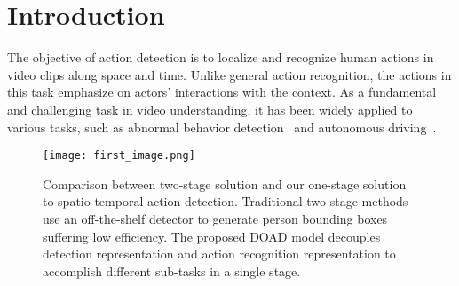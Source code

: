 \documentclass[final]{cvpr}
\begin{document}
\section{Introduction}
The objective of action detection is to localize and recognize human actions in video clips along space and time. Unlike general action recognition, the actions in this task emphasize on actors' interactions with the context. As a fundamental and challenging task in video understanding, it has been widely applied to various tasks, such as abnormal behavior detection~\cite{xu2015learning,lee2019bman} and autonomous driving~\cite{DBLP:journals/corr/abs-1912-00438}.

\begin{figure}[t]
\texttt{[image: first\_image.png]}
\centering
\caption{Comparison between two-stage solution and our one-stage solution to spatio-temporal action detection. Traditional two-stage methods use an off-the-shelf detector to generate person bounding boxes suffering low efficiency. The proposed DOAD model decouples detection representation and action recognition representation to accomplish different sub-tasks in a single stage.}
\label{first image}
\vspace{-5mm}
\end{figure}
\end{document}

